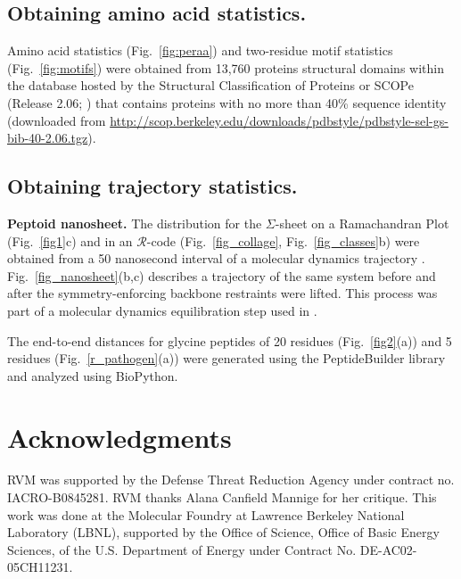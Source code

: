 \documentclass[fleqn,10pt]{wlpeerj} %
\newcommand{\Fig}[1]{Fig.~\ref{#1}}
\newcommand{\rr}{$\mathcal{R}$\xspace}
\begin{document}
\subsection*{Obtaining amino acid statistics.}
\label{scop}

Amino acid statistics (\Fig{fig:peraa}) and two-residue motif statistics (\Fig{fig:motifs}) were obtained from 13,760 proteins structural domains within the database hosted by the Structural Classification of Proteins or SCOPe (Release 2.06; \cite{Fox2014}) 
that contains proteins with no more than 40\% sequence identity (downloaded from 
\url{http://scop.berkeley.edu/downloads/pdbstyle/pdbstyle-sel-gs-bib-40-2.06.tgz}).\\

\subsection*{Obtaining trajectory statistics.}
\label{scop}

\textbf{Peptoid nanosheet.} The distribution for the $\Sigma$-sheet on a Ramachandran Plot (\Fig{fig1}c) and in an \rr-code (\Fig{fig_collage}, \Fig{fig_classes}b) were obtained from a 50 nanosecond interval of a molecular dynamics trajectory \citep{Mannige2015}. \Fig{fig_nanosheet}(b,c) describes a trajectory of the same system before and after the symmetry-enforcing backbone restraints were lifted. This process was part of a molecular dynamics equilibration step used in \cite{Mannige2015}.

The end-to-end distances for glycine peptides of 20 residues (\Fig{fig2}(a)) and 5 residues (\Fig{r_pathogen}(a)) were generated using the PeptideBuilder library\citep{Matthew2013} and analyzed using BioPython\citep{Cock2009}.


\section*{Acknowledgments}

RVM was supported by the Defense Threat Reduction Agency under contract no. IACRO-B0845281. RVM thanks Alana Canfield Mannige for her critique. This work was done at the Molecular Foundry at Lawrence Berkeley National Laboratory (LBNL), supported by the Office of Science, Office of Basic Energy Sciences, of the U.S. Department of Energy under Contract No. DE-AC02-05CH11231.


\end{document}

